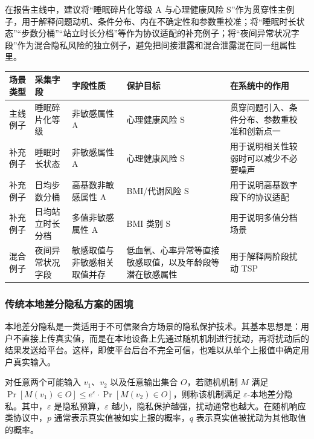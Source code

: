 \documentclass{cumcmthesis}
\numberwithin{equation}{section}
\numberwithin{figure}{section}
\numberwithin{table}{section}
\begin{document}
在报告主线中，建议将“睡眠碎片化等级 A 与心理健康风险 S”作为贯穿性主例子，用于解释问题动机、条件分布、内在不确定性和参数重校准；将“睡眠时长状态”“步数分桶”“站立时长分档”等作为协议适配的补充例子；将“夜间异常状况字段”作为混合隐私风险的独立例子，避免把间接泄露和混合泄露混在同一组属性里。

\begin{table}[htbp]
\centering
\small
\begin{tabularx}{\textwidth}{|>{\raggedright\arraybackslash}X|>{\raggedright\arraybackslash}X|>{\raggedright\arraybackslash}X|>{\raggedright\arraybackslash}X|>{\raggedright\arraybackslash}X|}
\hline
场景类型 & 采集字段 & 字段性质 & 保护目标 & 在系统中的作用 \\ \hline
主线例子 & 睡眠碎片化等级 & 非敏感属性 A & 心理健康风险 S & 贯穿问题引入、条件分布、参数重校准和创新点一 \\ \hline
补充例子 & 睡眠时长状态 & 非敏感属性 A & 心理健康风险 S & 用于说明相关性较弱时可以减少不必要噪声 \\ \hline
补充例子 & 日均步数分桶 & 高基数非敏感属性 A & BMI/代谢风险 S & 用于说明高基数字段下的协议适配 \\ \hline
补充例子 & 日均站立时长分档 & 多值非敏感属性 A & BMI 类别 S & 用于说明多值分档场景 \\ \hline
混合例子 & 夜间异常状况字段 & 敏感取值与非敏感相关取值并存 & 低血氧、心率异常等直接敏感取值，以及年龄段等潜在敏感属性 & 用于解释两阶段扰动 TSP \\ \hline
\end{tabularx}
\end{table}

\subsubsection{传统本地差分隐私方案的困境}

本地差分隐私是一类适用于不可信聚合方场景的隐私保护技术。其基本思想是：用户不直接上传真实值，而是在本地设备上先通过随机机制进行扰动，再将扰动后的结果发送给平台。这样，即使平台后台不完全可信，也难以从单个上报值中确定用户真实输入。

对任意两个可能输入 \(v_1\)、\(v_2\) 以及任意输出集合 \(O\)，若随机机制 \(M\) 满足 \(\Pr[M(v_1)\in O]\le e^{\varepsilon}\cdot \Pr[M(v_2)\in O]\)，则称该机制满足 \(\varepsilon\)-本地差分隐私。其中，\(\varepsilon\) 是隐私预算，\(\varepsilon\) 越小，隐私保护越强，扰动通常也越大。在随机响应类协议中，\(p\) 通常表示真实值被如实上报的概率，\(q\) 表示真实值被扰动为其他取值的概率。
\end{document}
